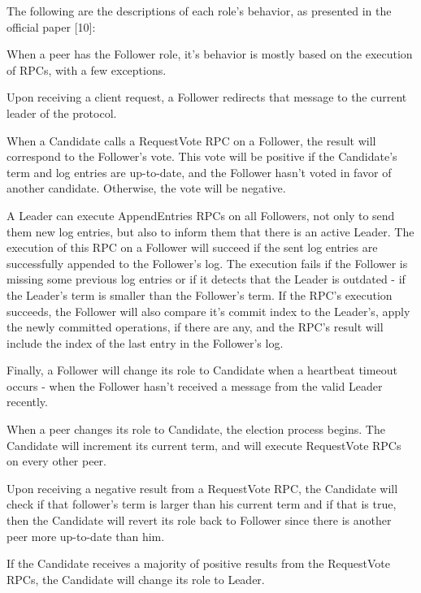 The following are the descriptions of each role’s behavior, as presented in the official paper [10]:

When a peer has the Follower role, it’s behavior is mostly based on the execution of RPCs, with a few exceptions.

Upon receiving a client request, a Follower redirects that message to the current leader of the protocol.

When a Candidate calls a RequestVote RPC on a Follower, the result will correspond to the Follower’s vote. This vote will be positive if the Candidate’s term and log entries are up-to-date, and the Follower hasn’t voted in favor of another candidate. Otherwise, the vote will be negative.

A Leader can execute AppendEntries RPCs on all Followers, not only to send them new log entries, but also to inform them that there is an active Leader. The execution of this RPC on a Follower will succeed if the sent log entries are successfully appended to the Follower’s log. The execution fails if the Follower is missing some previous log entries or if it detects that the Leader is outdated - if the Leader’s term is smaller than the Follower’s term. If the RPC’s execution succeeds, the Follower will also compare it’s commit index to the Leader’s, apply the newly committed operations, if there are any, and the RPC’s result will include the index of the last entry in the Follower’s log.

Finally, a Follower will change its role to Candidate when a heartbeat timeout occurs - when the Follower hasn’t received a message from the valid Leader recently.

\vspace{0.5cm}

When a peer changes its role to Candidate, the election process begins. The Candidate will increment its current term, and will execute RequestVote RPCs on every other peer.

Upon receiving a negative result from a RequestVote RPC, the Candidate will check if that follower’s term is larger than his current term and if that is true, then the Candidate will revert its role back to Follower since there is another peer more up-to-date than him.

If the Candidate receives a majority of positive results from the RequestVote RPCs, the Candidate will change its role to Leader.

\vspace{0.5cm}

